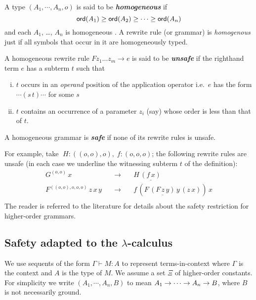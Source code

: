 \documentclass{llncs}
\newcommand\defname[1]{{\bf\em #1}\index{#1}}
\begin{document}
A type $(A_1, \cdots, A_n, o)$ is said to be \defname{homogeneous} if
\[{\sf ord}(A_1) \geq {\sf ord}(A_2)\geq \cdots \geq {\sf ord}(A_n)\] and each $A_1$,
\ldots, $A_n$ is homogeneous \cite{KNU02}.  A rewrite rule (or
grammar) is \emph{homogenous} just if all symbols that occur in it are
homogeneously typed.

\begin{definition}\rm
  A homogeneous rewrite rule $F z_1 \ldots z_m \rightarrow e$ is said
  to be \defname{unsafe} if the righthand term $e$ has a subterm $t$
  such that
\begin{enumerate}[(i)]
\item $t$ occurs in an \emph{operand} position of the application
  operator i.e.~$e$ has the form $\cdots (s \, t) \cdots $ for some
  $s$
\item $t$ contains an occurrence of a parameter $z_i$ (say) whose
  order is less than that of $t$.
\end{enumerate}
A homogeneous grammar is \defname{safe} if none of its rewrite rules
is unsafe.
\end{definition}

For example, take $\; H : ((o, o), o), \; f : (o, o, o)$; the
following rewrite rules are unsafe (in each case we underline the
witnessing subterm $t$ of the definition):
\[\begin{array}{rll}
G^{(o, o)} \, x & \quad \rightarrow \quad & H \, \underline{(f \, {x})} \\
F^{((o, o), o, o, o)} \, z \, x \, y & \quad \rightarrow \quad & f \, (F \, \underline{(F \, z
\, {y})} \, y \, (z \, x) ) \, x \\
\end{array}\] The
reader is referred to the literature
\cite{KNU02,demirandathesis,safety-mirlong2004}
for details about the safety restriction for higher-order grammars.

\subsection*{Safety adapted to the $\lambda$-calculus}

We use sequents of the form $\Gamma \vdash M : A$ to represent
terms-in-context where $\Gamma$ is the context and $A$ is the type of
$M$. We assume a set $\Xi$ of higher-order constants. For simplicity
we write $(A_1, \cdots, A_n, B)$ to mean $A_1 \rightarrow \cdots \rightarrow
A_n \rightarrow B$, where $B$ is not necessarily ground.
\end{document}
